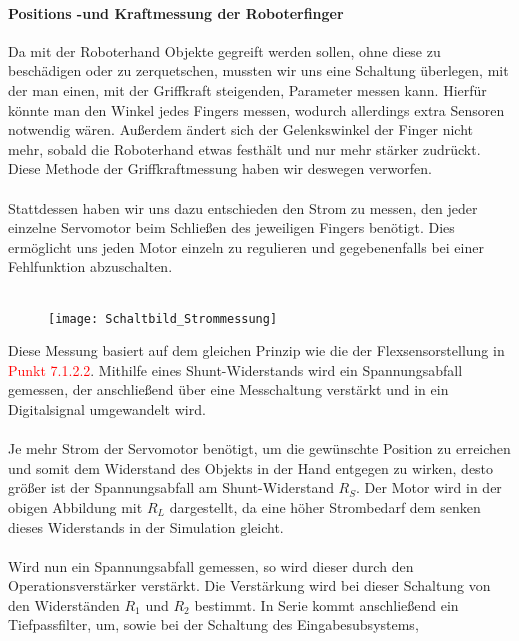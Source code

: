 \documentclass[titlepage,12pt,twoside]{article}
\begin{document}
\paragraph{Positions -und Kraftmessung der Roboterfinger}
\hfill \break
\hfill \break
Da mit der Roboterhand Objekte gegreift werden sollen, ohne diese zu beschädigen oder zu zerquetschen, mussten wir uns eine Schaltung überlegen,
mit der man einen, mit der Griffkraft steigenden, Parameter messen kann. Hierfür könnte man den Winkel jedes Fingers messen, wodurch
allerdings extra Sensoren notwendig wären. Außerdem ändert sich der Gelenkswinkel der Finger nicht mehr, sobald die Roboterhand
etwas festhält und nur mehr stärker zudrückt. Diese Methode der Griffkraftmessung haben wir deswegen verworfen. \\
\\
Stattdessen haben wir uns dazu entschieden den Strom zu messen, den jeder einzelne Servomotor beim Schließen des jeweiligen Fingers
benötigt. Dies ermöglicht uns jeden Motor einzeln zu regulieren und gegebenenfalls bei einer Fehlfunktion abzuschalten. \\
\\
\begin{figure}[H]
	\begin{center}
		\scalebox{1.2}
		{\texttt{[image: Schaltbild\_Strommessung]}}
	\end{center}
\end{figure}
\hfill \break
Diese Messung basiert auf dem gleichen Prinzip wie die der Flexsensorstellung in \textcolor{red}{Punkt 7.1.2.2}. Mithilfe eines 
Shunt-Widerstands wird ein Spannungsabfall gemessen, der anschließend über eine Messchaltung verstärkt und in ein Digitalsignal
umgewandelt wird. \\
\\
Je mehr Strom der Servomotor benötigt, um die gewünschte Position zu erreichen und somit dem Widerstand des Objekts in der Hand entgegen
zu wirken, desto größer ist der Spannungsabfall am Shunt-Widerstand $R_{S}$. Der Motor wird in der obigen Abbildung mit $R_{L}$ dargestellt,
da eine höher Strombedarf dem senken dieses Widerstands in der Simulation gleicht. \\
\\
Wird nun ein Spannungsabfall gemessen, so wird dieser durch den Operationsverstärker verstärkt. Die Verstärkung wird bei dieser Schaltung von 
den Widerständen $R_{1}$ und $R_{2}$ bestimmt. In Serie kommt anschließend ein Tiefpassfilter, um, sowie bei der Schaltung des Eingabesubsystems,
\end{document}
